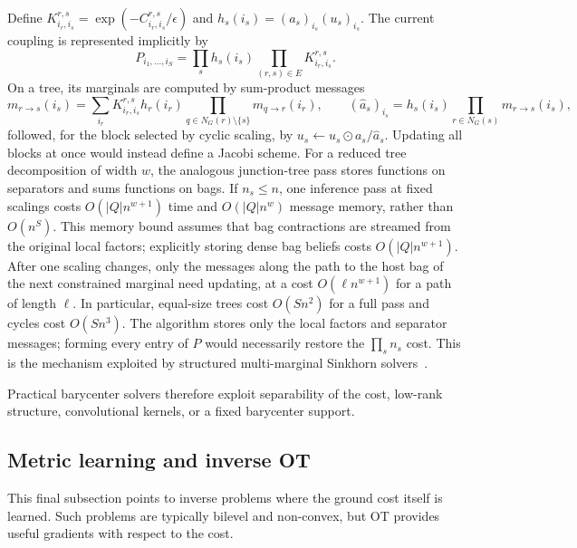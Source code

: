 Define $K^{r,s}_{i_r,i_s}=\exp(-C^{r,s}_{i_r,i_s}/\epsilon)$ and $h_s(i_s)=(a_s)_{i_s}(u_s)_{i_s}$. The current coupling is represented implicitly by
\[
	P_{i_1,\ldots,i_S}
	=
	\prod_s h_s(i_s)\prod_{(r,s)\in E}K^{r,s}_{i_r,i_s}.
\]
On a tree, its marginals are computed by sum-product messages
\[
	m_{r\to s}(i_s)
	=
	\sum_{i_r}K^{r,s}_{i_r,i_s}h_r(i_r)
	\prod_{q\in N_G(r)\setminus\{s\}}m_{q\to r}(i_r),
	\qquad
	(\widehat a_s)_{i_s}
	=
	h_s(i_s)\prod_{r\in N_G(s)}m_{r\to s}(i_s),
\]
followed, for the block selected by cyclic scaling, by $u_s\leftarrow u_s\odot a_s/\widehat a_s$. Updating all blocks at once would instead define a Jacobi scheme. For a reduced tree decomposition of width $w$, the analogous junction-tree pass stores functions on separators and sums functions on bags. If $n_s\leq n$, one inference pass at fixed scalings costs $O(|Q|n^{w+1})$ time and $O(|Q|n^w)$ message memory, rather than $O(n^S)$. This memory bound assumes that bag contractions are streamed from the original local factors; explicitly storing dense bag beliefs costs $O(|Q|n^{w+1})$. After one scaling changes, only the messages along the path to the host bag of the next constrained marginal need updating, at a cost $O(\ell n^{w+1})$ for a path of length $\ell$. In particular, equal-size trees cost $O(Sn^2)$ for a full pass and cycles cost $O(Sn^3)$. The algorithm stores only the local factors and separator messages; forming every entry of $P$ would necessarily restore the $\prod_s n_s$ cost. This is the mechanism exploited by structured multi-marginal Sinkhorn solvers~\cite{HaaslerSinghZhangKarlssonChen2020PGMMOT,FanHaaslerKarlssonChen2021GraphCostMOT,AltschulerBoixAdsera2022StructuredMOT}.

Practical barycenter solvers therefore exploit separability of the cost, low-rank structure, convolutional kernels, or a fixed barycenter support.


\subsection{Metric learning and inverse OT}

This final subsection points to inverse problems where the ground cost itself is learned. Such problems are typically bilevel and non-convex, but OT provides useful gradients with respect to the cost.

